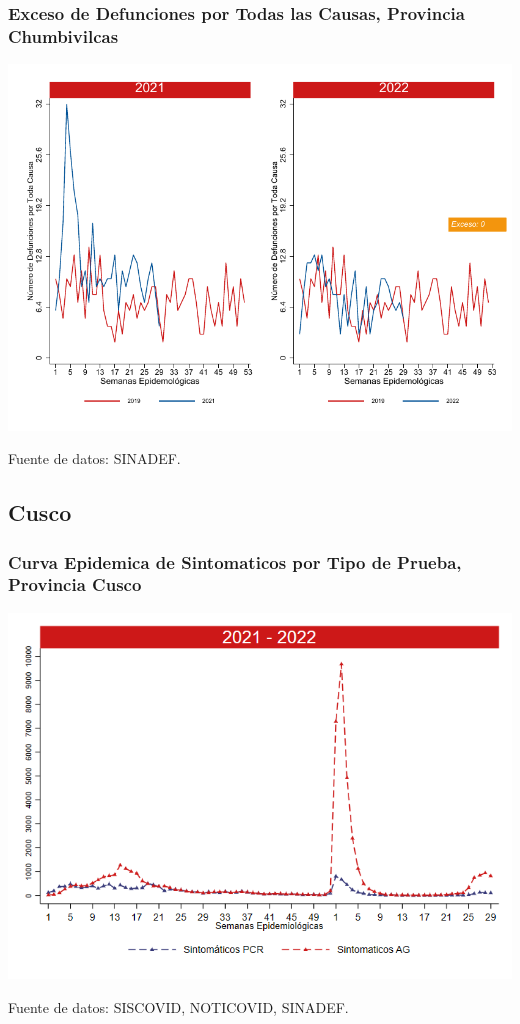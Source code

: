 \documentclass[xcolor=table]{beamer}
\begin{document}
\begin{frame}
	\frametitle{Exceso de Defunciones por Todas las Causas, Provincia Chumbivilcas}
	\vspace{-.5cm}
	\begin{center}
		\includegraphics[width=0.8\linewidth, trim={0cm .5cm 0cm 0.2cm},clip]{../figuras/exceso_6.pdf}
	\end{center}
	{\tiny Fuente de datos: SINADEF.}
	
	\hyperlink{indicadores_provinciales}{}
\end{frame}

\subsection{Cusco}
\begin{frame}[label=Cusco]
	\frametitle{Curva Epidemica de Sintomaticos por Tipo de Prueba, Provincia Cusco}
	\vspace{-.5cm}
	\begin{center}
		\includegraphics[width=0.8\linewidth, trim={0cm .5cm 0cm 0.2cm},clip]{../figuras/sinto_prueba20_21_7.png}
	\end{center}
	{\tiny Fuente de datos: SISCOVID, NOTICOVID, SINADEF.}
	\hyperlink{TipoPrueba}{}
\end{frame}
\end{document}
